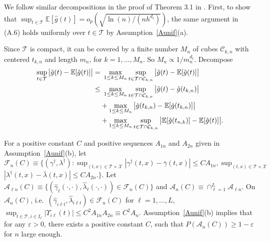 \documentclass[lettersize, 12pt]{article}
\begin{document}
{We follow similar decompositions in the proof of Theorem 3.1 in \cite{Fan}.
First, to show that $\sup_{t\in \mathcal{T}} \mathbb{E}[\hat g(t)] = o_p(\sqrt{\ln(n)/(nh^{d_t})})$,
the same argument in (A.6) holds uniformly over $t\in\mathcal{T}$ by Assumption~\ref{Aunif}(a).

Since $\mathcal{T}$ is compact, it can be covered by a finite number $M_n$ of cubes $\mathcal{C}_{k,n}$ with centered $t_{k,n}$ and length $m_n$, for $k=1,...,M_n$.
So $M_n \propto 1/m_n^{d_t}$.
Decompose 
\begin{align}
\sup_{t\in \mathcal{T}} \big| \hat g(t) - \mathbb{E}[\hat g(t)] \big|
=&\ \max_{1\leq k\leq M_n }\sup_{t\in \mathcal{T}\cap \mathcal{C}_{k,n}} \big| \hat g(t) - \mathbb{E}[\hat g(t)] \big| 
\notag \\
\leq&\
\max_{1\leq k\leq M_n }\sup_{t\in \mathcal{T}\cap \mathcal{C}_{k,n}} \big| \hat g(t) -\hat g(t_{k,n}) \big| 
\label{Q1}\\
&+ 
\max_{1\leq k\leq M_n } \big| \hat g(t_{k,n}) - \mathbb{E}[\hat g(t_{k,n})] \big| 
\label{Q2}\\
&+ 
\max_{1\leq k\leq M_n }\sup_{t\in \mathcal{T}\cap \mathcal{C}_{k,n}} \big| \mathbb{E}[\hat g(t_{n,k})] - \mathbb{E}[\hat g(t)] \big|.
\label{Q3}
\end{align}

 
For a positive constant $C$ and positive sequences $A_{1n}$ and $A_{2n}$ given in Assumption~\ref{Aunif}(b), let 
$\mathcal{F}_n(C) \equiv\{( \gamma^\dagger, \lambda^\dagger): 
\sup_{(t,x)\in\mathcal{T}\times\mathcal{X}}| \gamma^\dagger(t,x) - \bar\gamma(t,x) | \leq C A_{1n}, 
\sup_{(t,x)\in\mathcal{T}\times\mathcal{X}}
$\\$| \lambda^\dagger(t,x) - \bar\lambda(t,x) | \leq C A_{2n}.
\}.$ %
Let $\mathcal{A}_{\ell n}(C) \equiv \{(\hat \gamma_{\ell}(\cdot,\cdot), \hat \lambda_{\ell}(\cdot,\cdot)) \in \mathcal{F}_n(C)\}$
and $\mathcal{A}_n(C) \equiv \cap_{\ell=1}^L \mathcal{A}_{\ell n}$.
On $\mathcal{A}_n(C)$, i.e.\ $(\hat \gamma_{i\ell t}, \hat \lambda_{i\ell t}) \in \mathcal{F}_n(C)$ for $\ell=1,...,L$, $\sup_{t\in\mathcal{T}, i\in I_\ell} |\Upsilon_{i\ell}(t)| \leq C^2 A_{1n}A_{2n} \equiv C^2 A_n$.
Assumption~\ref{Aunif}(b) implies that for any $\varepsilon >0$, there exists a positive constant $C$, such that $P(\mathcal{A}_n(C)) \geq 1-\varepsilon$ for $n$ large enough.

}
\end{document}
